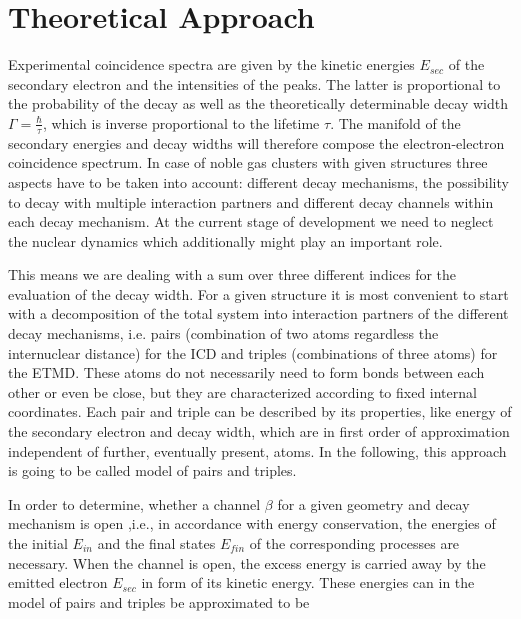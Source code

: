 \section{Theoretical Approach}
Experimental coincidence spectra are given by the kinetic energies $E_{sec}$
of the secondary electron
and the intensities of the peaks. The latter is proportional to the
probability of the decay as well as the theoretically determinable
decay width $\Gamma=\frac{\hbar}{\tau}$,
which is inverse proportional to the lifetime $\tau$. The manifold of the
secondary energies and decay widths will therefore compose the electron-electron
coincidence spectrum.
In case of noble gas clusters
with given structures three aspects have to be taken into account:
different decay mechanisms, the possibility to decay with multiple
interaction partners and different decay channels within each decay mechanism.
At the current stage of development we need to neglect the nuclear dynamics which
additionally might play an important role.

This means we are dealing with a sum over three different indices for the
evaluation of the decay width. For a given structure it is most convenient to
start with a decomposition of the total system into interaction partners of
the different decay mechanisms, i.e. pairs (combination of two atoms regardless
the internuclear distance) for the ICD and triples (combinations of three atoms)
for the ETMD.
These atoms do not necessarily need to form bonds between each other or
even be close, but they are characterized according to fixed internal
coordinates. Each pair and triple can be described by its properties, like
energy of the secondary electron and decay width,
which are in first order of approximation independent of further, eventually
present, atoms. In the following, this approach is going to be called
model of pairs and triples.



In order to determine, whether a channel $\beta$ for a given geometry and decay
mechanism is open ,i.e., in accordance with energy conservation,
the energies of the initial $E_{in}$ and the final states $E_{fin}$ of
the corresponding processes are necessary.
When the channel
is open, the excess energy is carried away by the emitted electron $E_{sec}$
in form of its kinetic energy. These energies can in the model
of pairs and triples be approximated to be

